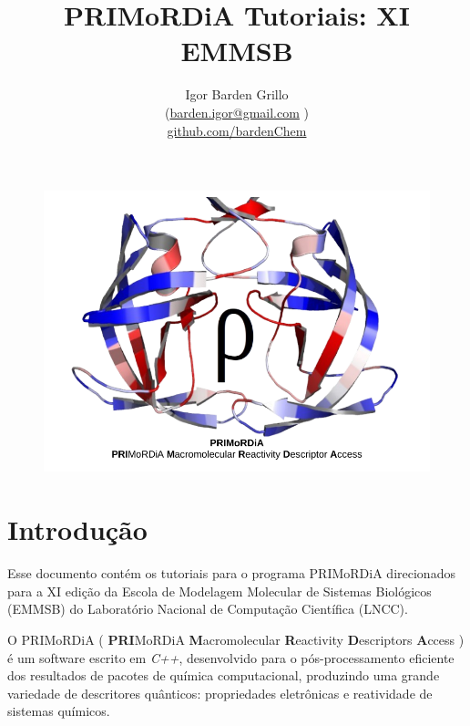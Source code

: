 \documentclass[a4paper,11pt]{refart}
\title{ \huge {PRIMoRDiA Tutoriais: XI EMMSB} }
\author{Igor Barden Grillo \\(\url{barden.igor@gmail.com} )\\\url{github.com/bardenChem}}
\begin{document}
	\maketitle
	
	
	\hspace*{-1.2\leftmarginwidth}
	\begin{minipage}{\fullwidth}
		\begin{figure}[H]
			\begin{center}
				\includegraphics[width=7in]{logo_primordia}
			\end{center}
		\end{figure}	
	\end{minipage}	
	\newpage
	
	\newpage
	\tableofcontents
	\newpage
	
	\section*{Introdução}
	
	
	Esse documento contém os tutoriais para o programa PRIMoRDiA direcionados para a XI edição da Escola de Modelagem Molecular de Sistemas Biológicos (EMMSB) do Laboratório Nacional de Computação Científica (LNCC). 
	
	O PRIMoRDiA ( \textbf{PRI}MoRDiA \textbf{M}acromolecular \textbf{R}eactivity \textbf{D}escriptors \textbf{A}ccess ) é um software escrito em \emph{C++}, desenvolvido para o pós-processamento eficiente dos resultados de pacotes de química computacional, produzindo uma grande variedade de descritores quânticos: propriedades eletrônicas e reatividade de sistemas químicos. 
	
\end{document}
